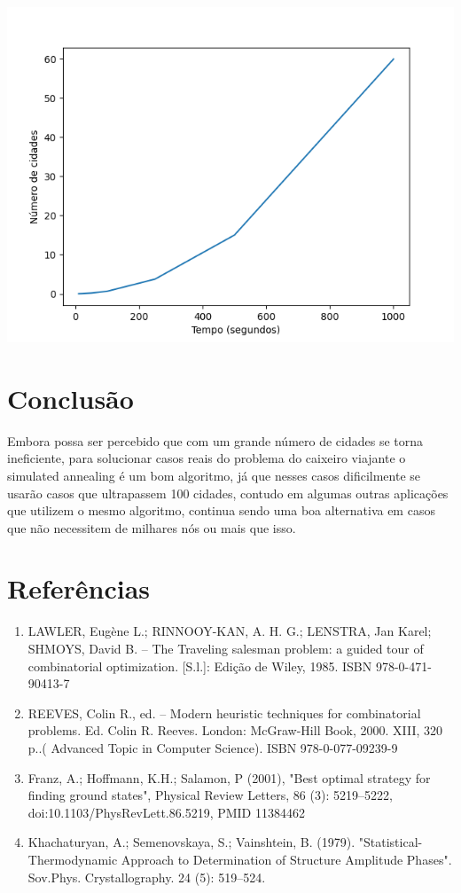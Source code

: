 \documentclass{article}
\begin{document}
  \includegraphics{fig1}

  \section{Conclusão}
  Embora possa ser percebido que com um grande número de cidades se torna ineficiente, para solucionar casos reais do problema do caixeiro viajante o simulated annealing é um bom algoritmo, já que nesses casos dificilmente se usarão casos que ultrapassem 100 cidades, contudo em algumas outras aplicações que utilizem o mesmo algoritmo, continua sendo uma boa alternativa em casos que não necessitem de milhares nós ou mais que isso.
  \section{Referências}

  \begin{enumerate}
    \item LAWLER, Eugène L.; RINNOOY-KAN, A. H. G.; LENSTRA, Jan Karel; SHMOYS, David B. – The Traveling salesman problem: a guided tour of combinatorial optimization. [S.l.]: Edição de Wiley, 1985. ISBN 978-0-471-90413-7
    \item REEVES, Colin R., ed. – Modern heuristic techniques for combinatorial problems. Ed. Colin R. Reeves. London: McGraw-Hill Book, 2000. XIII, 320 p..( Advanced Topic in Computer Science). ISBN 978-0-077-09239-9
    \item Franz, A.; Hoffmann, K.H.; Salamon, P (2001), "Best optimal strategy for finding ground states", Physical Review Letters, 86 (3): 5219–5222, doi:10.1103/PhysRevLett.86.5219, PMID 11384462
    \item Khachaturyan, A.; Semenovskaya, S.; Vainshtein, B. (1979). "Statistical-Thermodynamic Approach to Determination of Structure Amplitude Phases". Sov.Phys. Crystallography. 24 (5): 519–524.

\end{enumerate}
\end{document}
